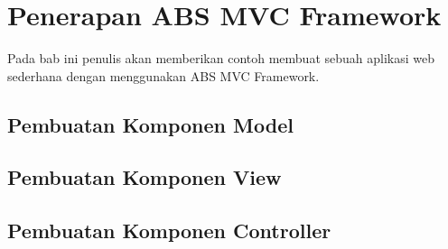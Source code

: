 \chapter{Penerapan ABS MVC Framework}

Pada bab ini penulis akan memberikan contoh membuat sebuah aplikasi web sederhana dengan menggunakan ABS MVC Framework.

\section{Pembuatan Komponen Model}
\section{Pembuatan Komponen View}
\section{Pembuatan Komponen Controller}